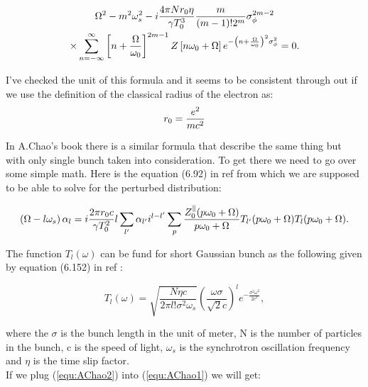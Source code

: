 \documentclass{article}
\begin{document}
	{\begin{multline}\label{equ:JMWang2}
		\Omega^2-m^2\omega_s^2
		-i\frac{4\pi Nr_0\eta}{\gamma T_0^3}\frac{m}{(m-1)!2^m}\sigma_\phi^{2m-2}\\
		\times \sum_{n=-\infty}^{\infty}{\left[n+\frac{\Omega}{\omega_0}\right]^{2m-1}Z\left[n\omega_0+\Omega\right]e^{-\left(n+{\Omega \over \omega_0}\right)^2\sigma_\phi^2}}=0.
	\end{multline}
	
	I've checked the unit of this formula and it seems to be consistent through out if we use the definition of the classical radius of the electron as:
	$$ r_0 = {{e^2} \over {m c^2}}$$
	
	In A.Chao's book\cite{A.Chao} there is a similar formula that describe the same thing but with only single bunch taken into consideration. To get there we need to go over some simple math. Here is the equation (6.92) in ref \cite{A.Chao} from which we are supposed to be able to solve for the perturbed distribution:
	
	\begin{equation}\label{equ:AChao1}
		\left(\Omega-l\omega_s\right)\alpha_l = i \frac{2\pi r_0 c}{\gamma T_0^2}l\sum_{l'}\alpha_{l'}i^{l-l'}\\
		\sum_{p}\frac{Z_0^\parallel(p\omega_0+\Omega)}{p\omega_0+\Omega}T_{l'}(p\omega_0+\Omega)T_{l}(p\omega_0+\Omega).
	\end{equation}

	The function $T_l(\omega)$ can be fund for short Gaussian bunch as the following given by equation (6.152) in ref \cite{A.Chao}:
	
	\begin{equation}\label{equ:AChao2}
	T_l(\omega) = \sqrt{\frac{N\eta c}{2\pi l! \sigma^2\omega_s}}\left(\frac{\omega \sigma }{\sqrt2  c}\right)^l e^{-\frac{\sigma^2\omega^2}{2c^2}},
	\end{equation}
	
	where the $\sigma$ is the bunch length in the unit of meter, N is the number of particles in the bunch, c is the speed of light, $\omega_s$ is the synchrotron oscillation frequency and $\eta$ is the time slip factor. \\
	If we plug (\ref{equ:AChao2}) into (\ref{equ:AChao1}) we will get:
	
}
\end{document}
